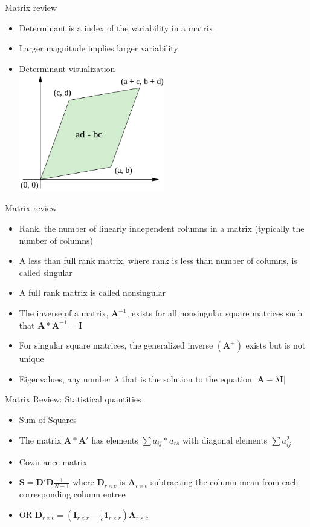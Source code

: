 \documentclass[handout,x11names,unknownkeysallowed]{beamer}
\begin{document}
\begin{frame}
Matrix review
\begin{itemize}
\item Determinant is a index of the variability in a matrix
\item Larger magnitude implies larger variability
\item Determinant visualization \\
\includegraphics[width=0.5\textwidth]{determinant.png}
\end{itemize}
\end{frame}


\begin{frame}
Matrix review
\begin{itemize}
\item Rank, the number of linearly independent columns in a matrix (typically the number of columns)
\item A less than full rank matrix, where rank is less than number of columns, is called singular
\item A full rank matrix is called nonsingular
\item The inverse of a matrix, $\bm{A}^{-1}$, exists for all nonsingular square matrices such that $\bm{A} \ast \bm{A}^{-1} = \bm{I}$
\item For singular square matrices, the generalized inverse $(\bm{A}^{+})$ exists but is not unique
\item Eigenvalues, any number $\lambda$ that is the solution to the equation $|\bm{A}-\lambda\bm{I}|$
\end{itemize}
\end{frame}

\begin{frame}
Matrix Review: Statistical quantities
\begin{itemize}
\item Sum of Squares
\item The matrix $\bm{A}*\bm{A}'$ has elements $\sum a_{ij}*a_{rs}$ with diagonal elements  $\sum a_{ij}^2$
\item Covariance matrix
\item $\bm{S} = \bm{D'D}\frac{1}{N-1}$ where $\bm{D}_{r \times c}$ is $\bm{A}_{r \times c}$ subtracting the column mean from each corresponding column entree
\item OR $\bm{D}_{r \times c} = (\bm{I}_{r \times r} - \frac{1}{c}\bm{1}_{r \times r})\bm{A}_{r \times c}$
\end{itemize}
\end{frame}
\end{document}
